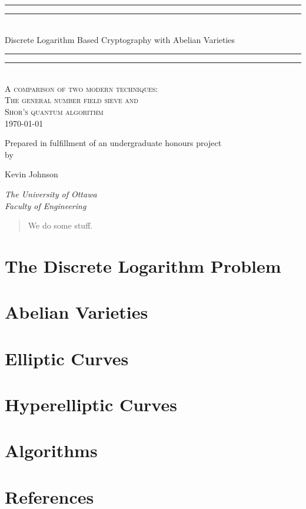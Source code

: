 \documentclass[10pt,a4paper]{article}
\theoremstyle{plain}
\theoremstyle{definition}
\theoremstyle{remark}
\newcommand*{\titleGP}{
  \begingroup %
    \centering %
    \vspace*{\baselineskip} %
    \rule{\textwidth}{1.6pt}\vspace*{-\baselineskip}\vspace*{2pt} %
    \rule{\textwidth}{0.4pt}\\[\baselineskip] %
    {\huge Discrete Logarithm Based Cryptography with Abelian Varieties}\\[0.2\baselineskip] %
    \rule{\textwidth}{0.4pt}\vspace*{-\baselineskip}\vspace{3.2pt} %
    \rule{\textwidth}{1.6pt}\\[\baselineskip] %
    \scshape %
    A comparison of two modern techniques: \\ %
    The general number field sieve and \\
    Shor's quantum algorithm  \\[\baselineskip] %
    \today \par %
    \vspace*{2\baselineskip} %
    Prepared in fulfillment of an undergraduate honours project  \\
    by \\[\baselineskip]
    {\Large Kevin Johnson \par} %
    \vspace*{2\baselineskip} 
    {\itshape The University of Ottawa \\ Faculty of Engineering \par} %
    \vspace*{3\baselineskip} 
    \begin{abstract}
      We do some stuff. 
    \end{abstract}
    \vfill
  \endgroup
}
\begin{document}
  \titleGP
  \newpage
  \tableofcontents
  \newpage

    
  \section{The Discrete Logarithm Problem}
    
  \section{Abelian Varieties}
    
  \section{Elliptic Curves}
    
  \section{Hyperelliptic Curves}
    
  \section{Algorithms}
    
    \newpage
  \section{References}
    
\end{document}
